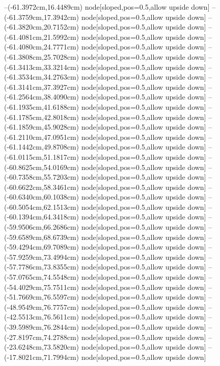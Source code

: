 --(-61.3972cm,16.4489cm) node[sloped,pos=0.5,allow upside down]{\ArrowIn}
--(-61.3759cm,17.3942cm) node[sloped,pos=0.5,allow upside down]{\arrowIn}
--(-61.3820cm,20.7152cm) node[sloped,pos=0.5,allow upside down]{\ArrowIn}
--(-61.4081cm,21.5992cm) node[sloped,pos=0.5,allow upside down]{\arrowIn}
--(-61.4080cm,24.7771cm) node[sloped,pos=0.5,allow upside down]{\ArrowIn}
--(-61.3808cm,25.7028cm) node[sloped,pos=0.5,allow upside down]{\arrowIn}
--(-61.3413cm,33.3214cm) node[sloped,pos=0.5,allow upside down]{\ArrowIn}
--(-61.3534cm,34.2763cm) node[sloped,pos=0.5,allow upside down]{\arrowIn}
--(-61.3141cm,37.3927cm) node[sloped,pos=0.5,allow upside down]{\ArrowIn}
--(-61.2564cm,38.4090cm) node[sloped,pos=0.5,allow upside down]{\ArrowIn}
--(-61.1935cm,41.6188cm) node[sloped,pos=0.5,allow upside down]{\ArrowIn}
--(-61.1785cm,42.8018cm) node[sloped,pos=0.5,allow upside down]{\ArrowIn}
--(-61.1859cm,45.9028cm) node[sloped,pos=0.5,allow upside down]{\ArrowIn}
--(-61.2110cm,47.0951cm) node[sloped,pos=0.5,allow upside down]{\ArrowIn}
--(-61.1442cm,49.8708cm) node[sloped,pos=0.5,allow upside down]{\ArrowIn}
--(-61.0115cm,51.1817cm) node[sloped,pos=0.5,allow upside down]{\ArrowIn}
--(-60.8625cm,54.0169cm) node[sloped,pos=0.5,allow upside down]{\ArrowIn}
--(-60.7358cm,55.7203cm) node[sloped,pos=0.5,allow upside down]{\ArrowIn}
--(-60.6622cm,58.3461cm) node[sloped,pos=0.5,allow upside down]{\ArrowIn}
--(-60.6340cm,60.1038cm) node[sloped,pos=0.5,allow upside down]{\ArrowIn}
--(-60.5054cm,62.1513cm) node[sloped,pos=0.5,allow upside down]{\ArrowIn}
--(-60.1394cm,64.3418cm) node[sloped,pos=0.5,allow upside down]{\ArrowIn}
--(-59.9506cm,66.2686cm) node[sloped,pos=0.5,allow upside down]{\ArrowIn}
--(-59.6589cm,68.6739cm) node[sloped,pos=0.5,allow upside down]{\ArrowIn}
--(-59.4294cm,69.7089cm) node[sloped,pos=0.5,allow upside down]{\ArrowIn}
--(-57.9259cm,73.4994cm) node[sloped,pos=0.5,allow upside down]{\ArrowIn}
--(-57.7786cm,73.8355cm) node[sloped,pos=0.5,allow upside down]{\arrowIn}
--(-57.0765cm,74.5548cm) node[sloped,pos=0.5,allow upside down]{\ArrowIn}
--(-54.4029cm,75.7511cm) node[sloped,pos=0.5,allow upside down]{\ArrowIn}
--(-51.7669cm,76.5597cm) node[sloped,pos=0.5,allow upside down]{\ArrowIn}
--(-48.9549cm,76.7757cm) node[sloped,pos=0.5,allow upside down]{\ArrowIn}
--(-42.5513cm,76.5611cm) node[sloped,pos=0.5,allow upside down]{\ArrowIn}
--(-39.5989cm,76.2844cm) node[sloped,pos=0.5,allow upside down]{\ArrowIn}
--(-27.8197cm,74.2788cm) node[sloped,pos=0.5,allow upside down]{\ArrowIn}
--(-23.6248cm,73.5820cm) node[sloped,pos=0.5,allow upside down]{\ArrowIn}
--(-17.8021cm,71.7994cm) node[sloped,pos=0.5,allow upside down]{\ArrowIn}
